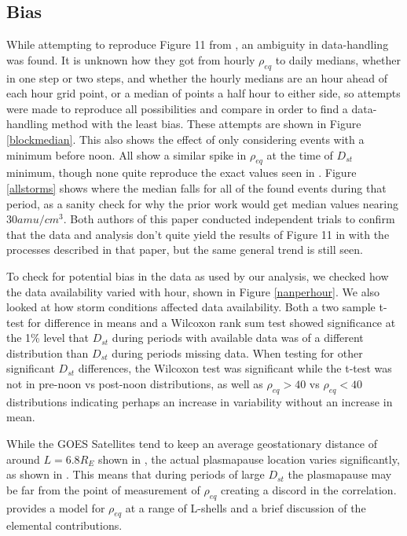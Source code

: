\documentclass[10pt,twocolumn]{article}
\begin{document}
\subsection{Bias}
While attempting to reproduce Figure 11 from \cite{Takahashi2010}, an ambiguity in data-handling was found. It is unknown how they got from hourly $\rho_{eq}$ to daily medians, whether in one step or two steps, and whether the hourly medians are an hour ahead of each hour grid point, or a median of points a half hour to either side, so attempts were made to reproduce all possibilities and compare in order to find a data-handling method with the least bias. These attempts are shown in Figure \ref{blockmedian}. This also shows the effect of only considering events with a minimum before noon. All show a similar spike in $\rho_{eq}$ at the time of $D_{st}$ minimum, though none quite reproduce the exact values seen in \cite{Takahashi2010}. Figure \ref{allstorms} shows where the median falls for all of the found events during that period, as a sanity check for why the prior work would get median values nearing $30 amu/cm^3$. Both authors of this paper conducted independent trials to confirm that the data and analysis don't quite yield the results of Figure 11 in \cite{Takahashi2010} with the processes described in that paper, but the same general trend is still seen. 

To check for potential bias in the data as used by our analysis, we checked how the data availability varied with hour, shown in Figure \ref{nanperhour}. We also looked at how storm conditions affected data availability. Both a two sample t-test for difference in means and a Wilcoxon rank sum test showed significance at the 1\% level that $D_{st}$ during periods with available data was of a different distribution than $D_{st}$ during periods missing data. When testing for other significant $D_{st}$ differences, the Wilcoxon test was significant while the t-test was not in pre-noon vs post-noon distributions, as well as $\rho_{eq}>40$ vs $\rho_{eq}<40$ distributions indicating perhaps an increase in variability without an increase in mean.

While the GOES Satellites tend to keep an average geostationary distance of around $L=6.8R_E$ shown in \cite{Takahashi2010}, the actual plasmapause location varies significantly, as shown in \cite{OBrien2003}. This means that during periods of large $D_{st}$ the plasmapause may be far from the point of measurement of $\rho_{eq}$ creating a discord in the correlation. \cite{Gallagher2000} provides a model for $\rho_{eq}$ at a range of L-shells and a brief discussion of the elemental contributions.
\end{document}
